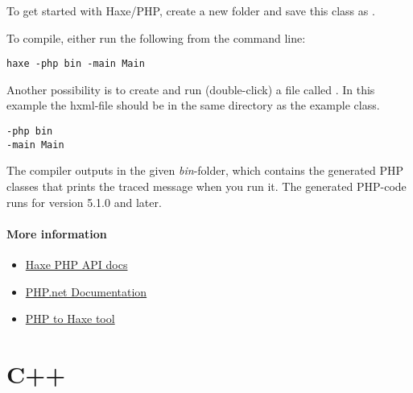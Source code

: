 To get started with Haxe/PHP, create a new folder and save this class as .


To compile, either run the following from the command line:

\begin{lstlisting}
haxe -php bin -main Main
\end{lstlisting}

Another possibility is to create and run (double-click) a file called . In this example the hxml-file should be in the same directory as the example class.

\begin{lstlisting}
-php bin
-main Main
\end{lstlisting}

The compiler outputs in the given \emph{bin}-folder, which contains the generated PHP classes that prints the traced message when you run it. The generated PHP-code runs for version 5.1.0 and later.

\paragraph{More information}

\begin{itemize}
	\item \href{http://api.haxe.org/php/}{Haxe PHP API docs}
	\item \href{http://php.net/docs.php}{PHP.net Documentation}
	\item \href{http://phptohaxe.haqteam.com/code.php}{PHP to Haxe tool}
\end{itemize}



\section{C++}
\label{target-cpp}

